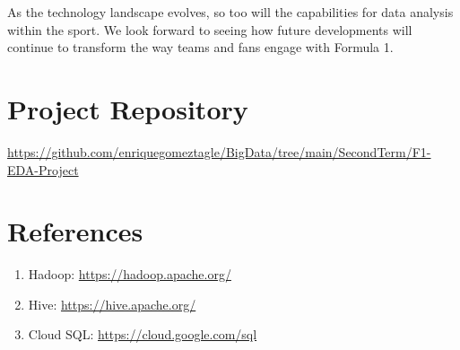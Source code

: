 \documentclass{article}
\begin{document}
As the technology landscape evolves, so too will the capabilities for data analysis within the sport. We look forward to seeing how future developments will continue to transform the way teams and fans engage with Formula 1.

\section{Project Repository}
\url{https://github.com/enriquegomeztagle/BigData/tree/main/SecondTerm/F1-EDA-Project}

\section{References}
\label{sec:references}
\begin{enumerate}
    \item Hadoop: \url{https://hadoop.apache.org/}
    \item Hive: \url{https://hive.apache.org/}
    \item Cloud SQL: \url{https://cloud.google.com/sql}
\end{enumerate}
\end{document}

